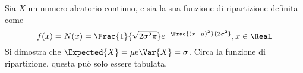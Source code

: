 \documentclass{subfiles}
\begin{document}
Sia $X$ un numero aleatorio continuo, e sia la sua funzione di ripartizione definita come
$$
    f(x) = N(x) = \Frac{1}{\sqrt{2\sigma^{2}\pi}}e^{- \Frac{(x - \mu)^{2}}{2 \sigma^{2}}}   , x \in \Real
$$
Si dimostra che $\Expected{X} = \mu \text{e} \Var{X} = \sigma$.
Circa la funzione di ripartizione, questa può solo essere tabulata\footnotemark[2].
\end{document}
